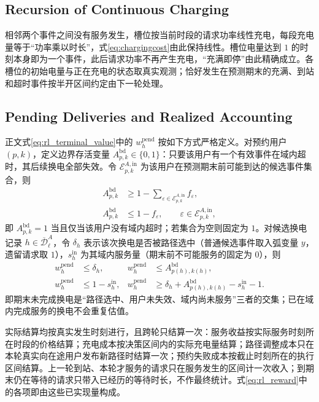 \documentclass[12pt,a4paper,UTF8]{ctexart}
\begin{document}
\subsection{Recursion of Continuous Charging}

相邻两个事件之间没有服务发生，槽位按当前时段的请求功率线性充电，每段充电量等于“功率乘以时长”，式\eqref{eq:chargingcost}由此保持线性。槽位电量达到 $1$ 的时刻本身即为一个事件，此后请求功率不再产生充电，“充满即停”由此精确成立。各槽位的初始电量与正在充电的状态取真实观测；恰好发生在预测期末的充满、到站和超时事件按半开区间约定由下一轮处理。

\subsection{Pending Deliveries and Realized Accounting}

正文式\eqref{eq:rl_terminal_value}中的 $w_h^{\mathrm{pend}}$ 按如下方式严格定义。对预约用户 $(p,k)$，定义边界存活变量 $A_{p,k}^{\mathrm{bd}}\in\{0,1\}$：只要该用户有一个有效事件在域内超时，其后续换电全部失效。令 $\mathcal E_{p,k}^{A,\mathrm{in}}$ 为该用户在预测期末前可能到达的候选事件集合，则
\begin{subequations}
\label{eq:boundary_alive}
\begin{align}
A_{p,k}^{\mathrm{bd}}
&\ge 1-\sum_{\varepsilon\in\mathcal E_{p,k}^{A,\mathrm{in}}}
f_\varepsilon,\\
A_{p,k}^{\mathrm{bd}}
&\le 1-f_\varepsilon,
\qquad \varepsilon\in\mathcal E_{p,k}^{A,\mathrm{in}},
\end{align}
\end{subequations}
即 $A_{p,k}^{\mathrm{bd}}=1$ 当且仅当该用户没有域内超时；若集合为空则固定为 $1$。对候选换电记录 $h\in\overline{\mathcal D}_{\ell}^{A}$，令 $\delta_h$ 表示该次换电是否被路径选中（普通候选事件取入弧变量 $y$，遗留请求取 $1$），$s_h^{\mathrm{in}}$ 为其域内服务量（期末前不可能服务的固定为 $0$），则
\begin{subequations}
\label{eq:pending_delivery_alive}
\begin{align}
w_h^{\mathrm{pend}}&\le\delta_h,&
w_h^{\mathrm{pend}}&\le A_{p(h),k(h)}^{\mathrm{bd}},\\
w_h^{\mathrm{pend}}&\le1-s_h^{\mathrm{in}},&
w_h^{\mathrm{pend}}
&\ge\delta_h+A_{p(h),k(h)}^{\mathrm{bd}}
-s_h^{\mathrm{in}}-1.
\end{align}
\end{subequations}
即期末未完成换电是“路径选中、用户未失效、域内尚未服务”三者的交集；已在域内完成服务的换电不会重复估值。

实际结算均按真实发生时刻进行，且跨轮只结算一次：服务收益按实际服务时刻所在时段的价格结算；充电成本按决策区间内的实际充电量结算；路径调整成本只在本轮真实向在途用户发布新路径时结算一次；预约失败成本按截止时刻所在的执行区间结算。上一轮到站、本轮才服务的请求只在服务发生的区间计一次收入；到期末仍在等待的请求只带入已经历的等待时长，不作最终统计。式\eqref{eq:rl_reward}中的各项即由这些已实现量构成。



\end{document}
